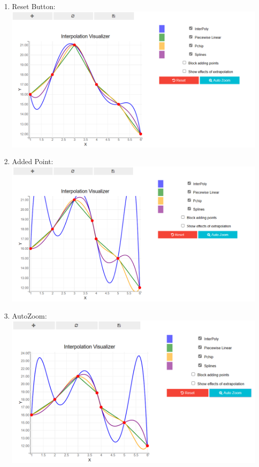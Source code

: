 \begin{enumerate}
\item Reset Button: \\
\includegraphics[scale=0.5]{Include/Images/Thesis/Documentation/Visualizers/Interpolation/Example 1/Example 1 - 02 - Reset Button.png}

\item Added Point: \\
\includegraphics[scale=0.5]{Include/Images/Thesis/Documentation/Visualizers/Interpolation/Example 1/Example 1 - 03 - Added Point.png}

\item AutoZoom: \\
\includegraphics[scale=0.5]{Include/Images/Thesis/Documentation/Visualizers/Interpolation/Example 1/Example 1 - 04 -AutoZoom.png}
\end{enumerate}

